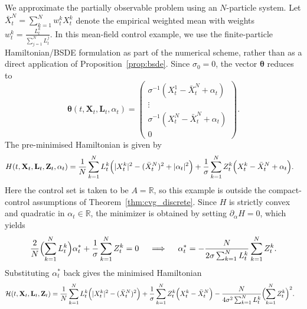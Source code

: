\documentclass[11pt]{article}
\numberwithin{equation}{section}
\theoremstyle{plain}
\theoremstyle{definition}
\theoremstyle{remark}
\begin{document}
		We approximate the partially observable problem using an $N$-particle system. Let $\bar{X}_t^N = \sum_{k=1}^N w_t^k X_t^k$ denote the empirical weighted mean with weights $w_t^k = \frac{L_t^k}{\sum_{j=1}^N L_t^j}$. In this mean-field control example, we use the finite-particle Hamiltonian/BSDE formulation as part of the numerical scheme, rather than as a direct application of Proposition~\ref{prop:bsde}. Since $\sigma_0 = 0$, the vector $\boldsymbol{\theta}$ reduces to
	\begin{equation*}
		\boldsymbol{\theta}(t,\mathbf{X}_t,\mathbf{L}_t,\alpha_t)
		= \begin{pmatrix}
			\sigma^{-1}(X_t^1 - \bar{X}_t^N + \alpha_t) \\
			\vdots \\
			\sigma^{-1}(X_t^N - \bar{X}_t^N + \alpha_t) \\
			0
		\end{pmatrix}.
	\end{equation*}
	The pre-minimised Hamiltonian is given by 
	\begin{equation*}
		\begin{aligned}
			H(t,\mathbf{X}_t,\mathbf{L}_t,\mathbf{Z}_t,\alpha_t)
			&= \frac{1}{N}\sum_{k=1}^N L_t^k
			\Bigl(|X_t^k|^2 - (\bar{X}_t^N)^2 + |\alpha_t|^2\Bigr)
			+ \frac{1}{\sigma}\sum_{k=1}^N Z_t^k
			\Bigl(X_t^k - \bar{X}_t^N + \alpha_t\Bigr).
		\end{aligned}
	\end{equation*}
		Here the control set is taken to be $A=\mathbb{R}$, so this example is outside the compact-control assumptions of Theorem~\ref{thm:cvg_discrete}. Since $H$ is strictly convex and quadratic in $\alpha_t \in \mathbb{R}$,
	the minimizer is obtained by setting $\partial_{\alpha} H = 0$, which yields  
	\begin{equation*}
		\frac{2}{N}\Bigl(\sum_{k=1}^N L_t^k\Bigr) \alpha_t^*
		+ \frac{1}{\sigma}\sum_{k=1}^N Z_t^k = 0
		\quad\implies\quad
		\alpha_t^* = -\frac{N}{2\sigma \sum_{k=1}^N L_t^k}\sum_{k=1}^N Z_t^k.
	\end{equation*}
	Substituting $\alpha_t^*$ back gives the minimised Hamiltonian 
	\begin{equation*}
		\begin{aligned}
			\mathcal{H}(t,\mathbf{X}_t,\mathbf{L}_t,\mathbf{Z}_t)
			&= \frac{1}{N}\sum_{k=1}^N L_t^k
			\Bigl(|X_t^k|^2 - (\bar{X}_t^N)^2\Bigr)
			+ \frac{1}{\sigma}\sum_{k=1}^N Z_t^k
			\Bigl(X_t^k - \bar{X}_t^N\Bigr)
			- \frac{N}{4\sigma^2 \sum_{k=1}^N L_t^k}
			\Bigl(\sum_{k=1}^N Z_t^k\Bigr)^2.
		\end{aligned}
	\end{equation*}
\end{document}
